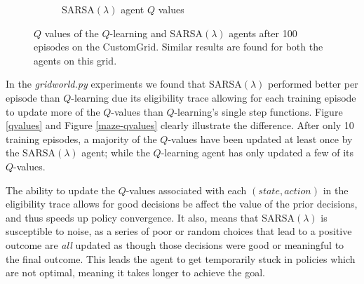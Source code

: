 \documentclass[10pt,conference]{IEEEtran}
\begin{document}
\begin{figure}[h]
\begin{subfigure}[b]{0.25\textwidth}
			\caption{SARSA\((\lambda)\) agent \(Q\) values}
		\end{subfigure}
		\caption{\(Q\) values of the \(Q\)-learning and SARSA\((\lambda)\) agents 
		after 100 episodes on the CustomGrid. Similar results are found for both the agents on this grid.}
		\label{custom-qvalues}
	\end{figure}

	In the \textit{gridworld.py} experiments we found that SARSA\((\lambda)\) 
	performed better per episode than \(Q\)-learning due its eligibility trace allowing for
	each training episode to update more of the \(Q\)-values than \(Q\)-learning's
	single step functions. Figure \ref{qvalues} and Figure \ref{maze-qvalues} clearly illustrate the difference. 
	After only 10 training episodes, a majority of the \(Q\)-values have been
	updated at least once by the SARSA\((\lambda)\) agent; while the \(Q\)-learning
	agent has only updated a few of its \(Q\)-values.

	The ability to update the \(Q\)-values associated with each \((state,action)\) 
	in the eligibility trace allows for good decisions be affect the value of the 
	prior decisions, and thus speeds up policy convergence.  It also, means that
	SARSA\((\lambda)\) is susceptible to noise, as a series of poor or random choices 
	that lead to a positive outcome are \textit{all} updated as though those 
	decisions were good or meaningful to the final outcome.  This leads the agent
	to get temporarily stuck in policies which are not optimal, meaning it takes longer
	to achieve the goal.
\end{document}
